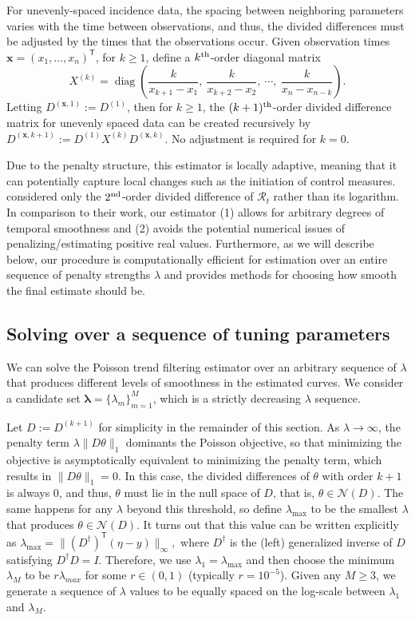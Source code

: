 \documentclass[10pt,letterpaper]{article}
\newcommand{\lr}[1]{\left(#1\right)}
\newcommand{\snorm}[1]{\lVert #1 \rVert}
\DeclareMathOperator*{\diag}{diag}
\def\bfx{\mathbf{x}}
\def\calR{\mathcal{R}}
\renewcommand{\top}{\mathsf{T}}
\def\th{^{\textnormal{th}}}
\def\second{$2^{\textnormal{nd}}$}
\begin{document}
For unevenly-spaced incidence data, the spacing between neighboring parameters
varies with the time between observations, and thus, the divided differences
must be adjusted by the times that the observations occur. Given observation
times $\bfx = {(x_1,\dots,x_n)}^\top$, for $k \geq 1$, define a $k\th$-order
diagonal matrix $$X^{(k)} = \diag \lr{\frac{k}{x_{k+1} - x_1},\ \frac{k}{x_{k+2}
- x_2},\ \cdots,\ \frac{k}{x_n - x_{n-k}} }.$$ Letting $D^{(\bfx,1)} := D^{(1)}$,
then for $k\geq 1$, the $(k+1)\th$-order divided difference matrix for unevenly
spaced data can be created recursively by
$D^{(\bfx, k+1)} := D^{(1)} X^{(k)} D^{(\bfx,k)}.$ No adjustment is required
for $k=0$. 


Due to the penalty structure, this estimator is locally adaptive,
meaning that it can potentially capture local changes such as the initiation of
control measures. \cite{abry2020spatial,pascal2022nonsmooth} considered only the
\second-order divided difference of $\calR_t$ rather than its logarithm. In
comparison to their work, our estimator (1) allows for arbitrary degrees of
temporal smoothness and (2) avoids the potential numerical issues of
penalizing/estimating positive real values. Furthermore, as we will describe
below, our procedure is computationally efficient for estimation over an entire
sequence of penalty strengths $\lambda$ and provides methods for choosing how
smooth the final estimate should be.


\subsection{Solving over a sequence of tuning parameters}
\label{sec:candidate-set}

We can solve the Poisson trend filtering estimator over an arbitrary sequence of 
$\lambda$ that produces different levels of smoothness in the estimated curves. 
We consider a candidate set $\boldsymbol{\lambda} = \{\lambda_m\}_{m=1}^M$, 
which is a strictly decreasing $\lambda$ sequence.


Let $D := D^{(k+1)}$ for simplicity in the remainder of this section. As
$\lambda \to\infty$, the penalty term $\lambda \snorm{D\theta}_1$ dominants the
Poisson objective, so that minimizing the objective is asymptotically equivalent
to minimizing the penalty term, which results in $\snorm{D\theta}_1 = 0$. In
this case, the divided differences of $\theta$ with order $k+1$ is always $0$,
and thus, $\theta$ must lie in the null space of $D$, that is,
$\theta\in\mathcal{N}(D)$. The same happens for any $\lambda$ beyond this
threshold, so define $\lambda_{\textrm{max}}$ to be the smallest $\lambda$ that
produces $\theta\in\mathcal{N}(D)$. It turns out that this value can be written
explicitly as $\lambda_{\textrm{max}} = \snorm{\lr{D^{\dagger}}^{\top} \lr{\eta
- y}}_{\infty},$ where $D^{\dagger}$ is the (left) generalized inverse of $D$
satisfying $D^{\dagger} D = I$. Therefore, we use $\lambda_1 =
\lambda_{\textrm{max}}$ and then choose the minimum $\lambda_M$ to be
$r\lambda_{max}$ for some $r \in (0,1)$ (typically $r=10^{-5}$). Given any
$M\geq 3$, we generate a sequence of $\lambda$ values to be equally spaced on
the log-scale between $\lambda_1$ and $\lambda_M$. 
\end{document}
